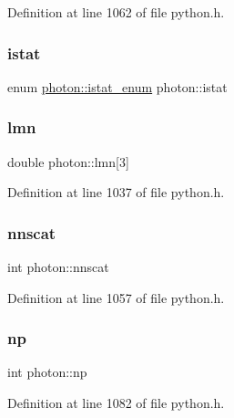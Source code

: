 Definition at line 1062 of file python.\+h.

\mbox{\label{structphoton_adf0be64e948d68d787555681d15e13e2}} 
\subsubsection{\texorpdfstring{istat}{istat}}
{\footnotesize\ttfamily enum \hyperlink{structphoton_ae56bb7ca587dc91f44d8c72a6a571f45}{photon\+::istat\+\_\+enum}  photon\+::istat}

\mbox{\label{structphoton_a1166dfb4c725aac37dafe72bcf1aec2b}} 
\subsubsection{\texorpdfstring{lmn}{lmn}}
{\footnotesize\ttfamily double photon\+::lmn\mbox{[}3\mbox{]}}



Definition at line 1037 of file python.\+h.

\mbox{\label{structphoton_a31ff1fe2cb5835980637f0cf4ab61ffc}} 
\subsubsection{\texorpdfstring{nnscat}{nnscat}}
{\footnotesize\ttfamily int photon\+::nnscat}



Definition at line 1057 of file python.\+h.

\mbox{\label{structphoton_ac6a38267c9cc04060e249c1cbaad3d9a}} 
\subsubsection{\texorpdfstring{np}{np}}
{\footnotesize\ttfamily int photon\+::np}



Definition at line 1082 of file python.\+h.

\mbox{\label{structphoton_ad91ab6667b2f4635925deb64ea7841bd}} 

